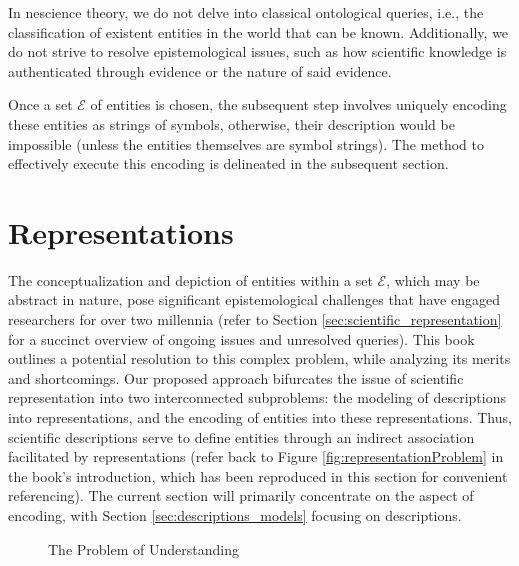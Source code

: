 In nescience theory, we do not delve into classical ontological queries, i.e., the classification of existent entities in the world that can be known. Additionally, we do not strive to resolve epistemological issues, such as how scientific knowledge is authenticated through evidence or the nature of said evidence.

Once a set $\mathcal{E}$ of entities is chosen, the subsequent step involves uniquely encoding these entities as strings of symbols, otherwise, their description would be impossible (unless the entities themselves are symbol strings). The method to effectively execute this encoding is delineated in the subsequent section.

%
%

\section{Representations}
\label{sec:representations}

The conceptualization and depiction of entities within a set $\mathcal{E}$, which may be abstract in nature, pose significant epistemological challenges that have engaged researchers for over two millennia (refer to Section \ref{sec:scientific_representation} for a succinct overview of ongoing issues and unresolved queries). This book outlines a potential resolution to this complex problem, while analyzing its merits and shortcomings. Our proposed approach bifurcates the issue of scientific representation into two interconnected subproblems: the modeling of descriptions into representations, and the encoding of entities into these representations. Thus, scientific descriptions serve to define entities through an indirect association facilitated by representations (refer back to Figure \ref{fig:representationProblem} in the book's introduction, which has been reproduced in this section for convenient referencing). The current section will primarily concentrate on the aspect of encoding, with Section \ref{sec:descriptions_models} focusing on descriptions.

\begin{figure}[t]
\centering
{}
\caption{The Problem of Understanding}
\end{figure}


